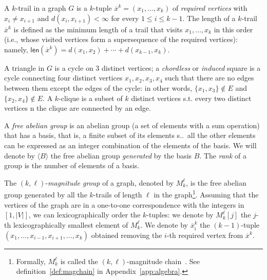 \documentclass{article}
\newtheorem{example}{Example}
\newcommand{\len}{\textsf{len}}
\begin{document}
	A $k$-trail in a graph $G$ is a $k$-tuple $\overline{x}^k=(x_1,\dots,x_k)$ 
	of \emph{required vertices}  with $x_i \neq x_{i+1}$ and $d(x_i,x_{i+1})<\infty$ for every $1 \leq i \leq k-1$.
	The length of a $k$-trail $\overline{x}^k$ is defined as the minimum length of a trail that visits $x_1,\ldots,x_k$ in this order (i.e., whose visited vertices form a supersequence of the required vertices): namely, 
	\(
	\len(\overline{x}^k) = d(x_1,x_2)+\cdots + d(x_{k-1},x_k).
	\) 
	
	A triangle in $G$ is a cycle on 3 distinct vertices; a \emph{chordless} or \emph{induced} square is a cycle connecting four distinct vertices $x_1,x_2,x_3,x_4$ such that there are no edges between them except the edges of the cycle: in other words, $\{x_1,x_3\}\notin E$ and $\{x_2,x_4\}\notin E$. 
	A $k$-clique is a subset of $k$ distinct vertices s.t. every two distinct vertices n the clique are connected by an edge.
	
	A \emph{free abelian group} is an abelian group (a set of elements with a sum operation) that has a basis, that is, a finite subset of its elements s.\@t.\ all the other elements can be expressed as an integer combination of the elements of the basis. We will denote by $\langle B\rangle$ the free abelian group \emph{generated} by the basis $B$. The \emph{rank} of a group is the number of elements of a basis.%
	
	The $(k,\ell)$-\emph{magnitude group} of a graph, denoted by $M_{k}^{\ell}$, is the free abelian group generated by all the $k$-trails of length $\ell$ in the graph\footnote{Formally, $M_{k}^{\ell}$ is called the $(k,\ell)$-magnitude chain~\cite{hepworth2015categorifying}. 
		See definition~\ref{def:magchain} in Appendix~\ref{app:algebra}.}.
	Assuming that the vertices of the graph are in a one-to-one correspondence with the integers in $[1,|V|]$, we can lexicographically order the $k$-tuples: we denote by $M_{k}^{\ell}[j]$ the $j$-th lexicographically smallest element of $M_{k}^{\ell}$. 
	We denote by $\overline{x}_{\hat{\imath}}^k$ the $(k-1)$-tuple $(x_1,\ldots,x_{i-1},x_{i+1},\ldots,x_k)$ obtained removing the $i$-th required vertex from $\overline{x}^k$.
	
\end{document}
